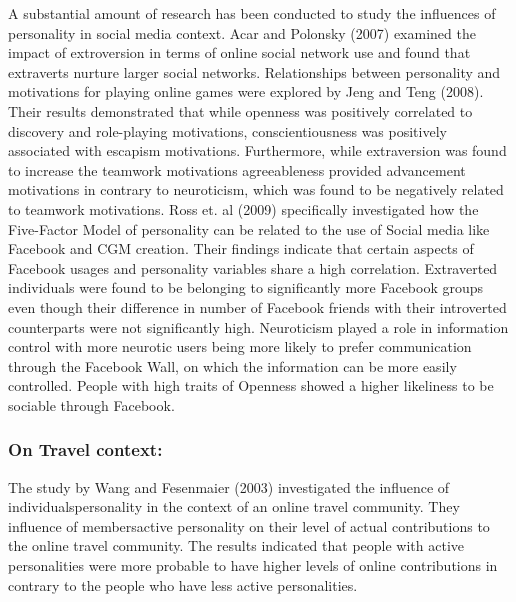 A substantial amount of research has been conducted to study the influences of personality in social media context. Acar and Polonsky (2007) examined the impact of extroversion in terms of online social network use and found that extraverts nurture larger social networks\cite{acar2007online}. Relationships between personality and motivations for playing online games were explored by Jeng and Teng (2008)\cite{jeng2008personality}. Their results demonstrated that while openness was positively correlated to discovery and role-playing motivations, conscientiousness was positively associated with escapism motivations. Furthermore, while extraversion was found to increase the teamwork motivations agreeableness provided advancement motivations in contrary to neuroticism, which was found to be negatively related to teamwork motivations. Ross et. al (2009) specifically investigated how the Five-Factor Model of personality can be related to the use of Social media like Facebook and CGM creation. Their findings indicate that certain aspects of Facebook usages and personality variables share a high correlation. Extraverted individuals were found to be belonging to significantly more Facebook groups even though their difference in number of Facebook friends with their introverted counterparts were not significantly high. Neuroticism played a role in information control with more neurotic users being more likely to prefer communication through the Facebook Wall, on which the information can be more easily controlled. People with high traits of Openness showed a higher likeliness to be sociable through Facebook\cite{ross2009personality}. 


\subsubsection{On Travel context: }

The study by Wang and Fesenmaier (2003) investigated the influence of individuals\textquotesingle personality in the context of an online travel community. They influence of members\textquotesingle active personality on their level of actual contributions to the online travel community. The results indicated that people with active personalities were more probable to have higher levels of online contributions in contrary to the people who have less active personalities.


